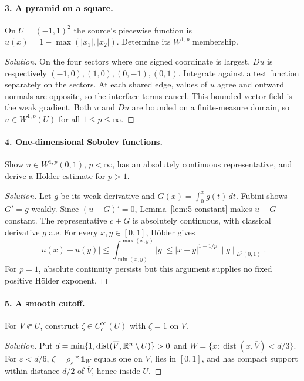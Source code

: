 \paragraph{3. A pyramid on a square.}
On $U=(-1,1)^2$ the source's piecewise function is
$u(x)=1-\max(|x_1|,|x_2|)$. Determine its $W^{1,p}$ membership.
\begin{proof}[Solution]
On the four sectors where one signed coordinate is largest, $Du$ is
respectively $(-1,0),(1,0),(0,-1),(0,1)$.
Integrate against a test function separately on the sectors.
At each shared edge, values of $u$ agree and outward normals are
opposite, so the interface terms cancel. This bounded vector field
is the weak gradient. Both $u$ and $Du$ are bounded on a finite-measure
domain, so $u\in W^{1,p}(U)$ for all $1\leq p\leq\infty$.
\end{proof}
\Needspace{45mm}

\paragraph{4. One-dimensional Sobolev functions.}
Show $u\in W^{1,p}(0,1)$, $p<\infty$, has an absolutely continuous
representative, and derive a H\"older estimate for $p>1$.
\begin{proof}[Solution]
Let $g$ be its weak derivative and $G(x)=\int_0^xg(t)\,dt$.
Fubini shows $G'=g$ weakly. Since $(u-G)'=0$,
Lemma~\ref{lem:5-constant} makes $u-G$ constant.
The representative $c+G$ is absolutely continuous, with classical
derivative $g$ a.e. For every $x,y\in[0,1]$, H\"older gives
\[
 |u(x)-u(y)|\leq\int_{\min(x,y)}^{\max(x,y)}|g|
 \leq|x-y|^{1-1/p}\|g\|_{L^p(0,1)}.
\]
For $p=1$, absolute continuity persists but this argument supplies no
fixed positive H\"older exponent.
\end{proof}

\paragraph{5. A smooth cutoff.}
For $V\Subset U$, construct $\zeta\in C_c^\infty(U)$ with $\zeta=1$ on $V$.
\begin{proof}[Solution]
Put $d=\min\{1,\operatorname{dist}(\overline V,\mathbb{R}^n\setminus U)\}>0$ and
$W=\{x:\operatorname{dist}(x,\overline V)<d/3\}$.
For $\varepsilon<d/6$, $\zeta=\rho_\varepsilon*\mathbf1_W$ equals
one on $V$, lies in $[0,1]$, and has compact support within distance
$d/2$ of $\overline V$, hence inside $U$.
\end{proof}

